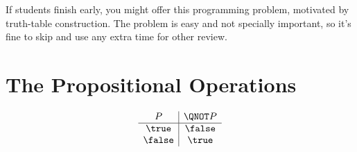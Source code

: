 \documentclass[handout]{mcs}
\begin{document}


\insolutions{\newpage}







\begin{staffnotes}
If students finish early, you might offer this programming problem,
motivated by truth-table construction.  The problem is easy and not
specially important, so it's fine to skip and use any extra time for
other review.
\end{staffnotes}

\iffalse

\begin{center}
\textbf{Supplmental Problem}\footnote{There is no need to study supplmental
  problems when preparing for quizzes or exams.}
\end{center}
\fi



\iffalse

\instatements{\newpage}
\section*{The Propositional Operations}

\[
\begin{array}{c|c}
P & \QNOT P \\ \hline
\true & \false \\
\false & \true \\
\end{array}
\]
\end{document}
